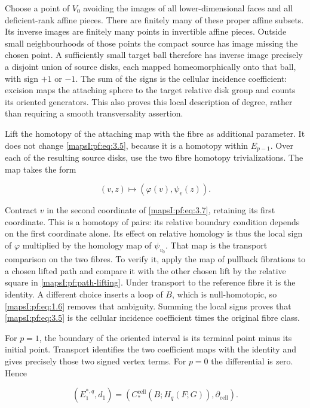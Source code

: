 \documentclass[11pt]{article}
\begin{document}
Choose a point of \(V_0\) avoiding the images of all lower-dimensional faces and all deficient-rank affine pieces. There are finitely many of these proper affine subsets. Its inverse images are finitely many points in invertible affine pieces. Outside small neighbourhoods of those points the compact source has image missing the chosen point. A sufficiently small target ball therefore has inverse image precisely a disjoint union of source disks, each mapped homeomorphically onto that ball, with sign \(+1\) or \(-1\). The sum of the signs is the cellular incidence coefficient: excision maps the attaching sphere to the target relative disk group and counts its oriented generators. This also proves this local description of degree, rather than requiring a smooth transversality assertion.

Lift the homotopy of the attaching map with the fibre as additional parameter. It does not change \eqref{mapsI:pf:eq:3.5}, because it is a homotopy within \(E_{p-1}\). Over each of the resulting source disks, use the two fibre homotopy trivializations. The map takes the form

\begin{equation}
(v,z)\longmapsto(\varphi(v),\psi_v(z)).
\label{mapsI:pf:eq:3.7}
\end{equation}

Contract \(v\) in the second coordinate of \eqref{mapsI:pf:eq:3.7}, retaining its first coordinate. This is a homotopy of pairs: its relative boundary condition depends on the first coordinate alone. Its effect on relative homology is thus the local sign of \(\varphi\) multiplied by the homology map of \(\psi_{v_0}\). That map is the transport comparison on the two fibres. To verify it, apply the map of pullback fibrations to a chosen lifted path and compare it with the other chosen lift by the relative square in \cref{mapsI:pf:path-lifting}. Under transport to the reference fibre it is the identity. A different choice inserts a loop of \(B\), which is null-homotopic, so \eqref{mapsI:pf:eq:1.6} removes that ambiguity. Summing the local signs proves that \eqref{mapsI:pf:eq:3.5} is the cellular incidence coefficient times the original fibre class.

For \(p=1\), the boundary of the oriented interval is its terminal point minus its initial point. Transport identifies the two coefficient maps with the identity and gives precisely those two signed vertex terms. For \(p=0\) the differential is zero. Hence

\begin{equation}
(E_1^{*,q},d_1)=
(C_*^{\mathrm{cell}}(B;H_q(F;G)),\partial_{\mathrm{cell}}).
\label{mapsI:pf:eq:3.8}
\end{equation}
\end{document}
